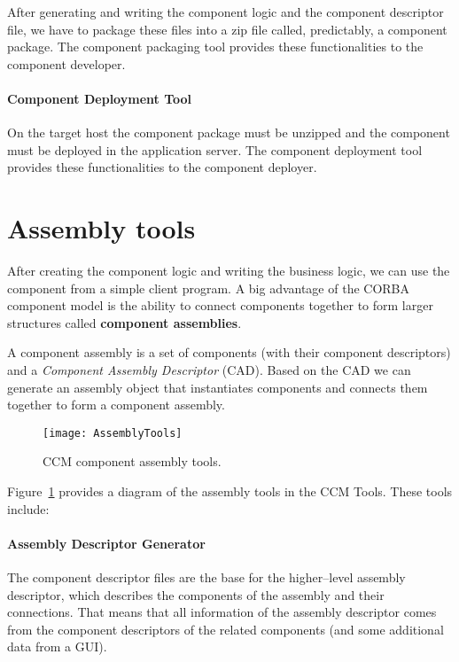 After generating and writing the component logic and the component descriptor
file, we have to package these files into a zip file called, predictably, a
component package. The component packaging tool provides these functionalities
to the component developer.

\paragraph{Component Deployment Tool}

On the target host the component package must be unzipped and the component must
be deployed in the application server. The component deployment tool provides
these functionalities to the component deployer.

\section{Assembly tools}

After creating the component logic and writing the business logic, we can use
the component from a simple client program. A big advantage of the CORBA
component model is the ability to connect components together to form larger
structures called {\bf component assemblies}.

A component assembly is a set of components (with their component descriptors)
and a {\it Component Assembly Descriptor} (CAD). Based on the CAD we can
generate an assembly object that instantiates components and connects them
together to form a component assembly.

\begin{figure}[!htb]
\texttt{[image: AssemblyTools]}
\caption{CCM component assembly tools.}
\label{fig:intro-AssemblyTools}
\end{figure}

Figure~\ref{fig:intro-AssemblyTools} provides a diagram of the assembly tools in
the CCM Tools. These tools include:

\paragraph{Assembly Descriptor Generator}

The component descriptor files are the base for the higher--level assembly
descriptor, which describes the components of the assembly and their
connections. That means that all information of the assembly descriptor comes
from the component descriptors of the related components (and some additional
data from a GUI).

